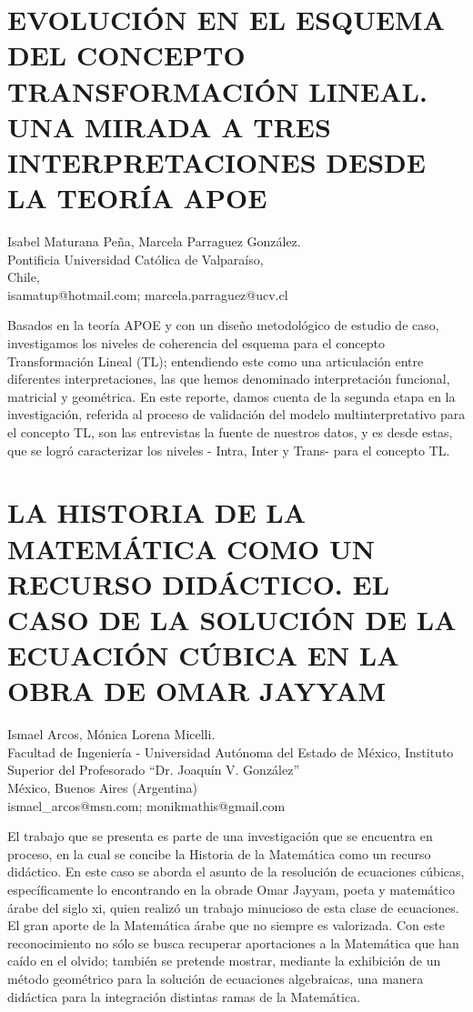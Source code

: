 \section{EVOLUCIÓN EN EL ESQUEMA DEL CONCEPTO TRANSFORMACIÓN LINEAL. UNA MIRADA
A TRES INTERPRETACIONES DESDE LA TEORÍA APOE}

\begin{datos}
Isabel Maturana Peña, Marcela Parraguez González. \\
 Pontificia Universidad Católica de Valparaíso, \\
\hfill Chile, \\
 \hfill  isamatup@hotmail.com; marcela.parraguez@ucv.cl
\end{datos}

Basados en la teoría APOE y con un diseño metodológico de estudio
de caso, investigamos los niveles de coherencia del esquema para el
concepto Transformación Lineal (TL); entendiendo este como una articulación
entre diferentes interpretaciones, las que hemos denominado interpretación
funcional, matricial y geométrica. En este reporte, damos cuenta de
la segunda etapa en la investigación, referida al proceso de validación
del modelo multinterpretativo para el concepto TL, son las entrevistas
la fuente de nuestros datos, y es desde estas, que se logró caracterizar
los niveles - Intra, Inter y Trans- para el concepto TL. 


\section{LA HISTORIA DE LA MATEMÁTICA COMO UN RECURSO DIDÁCTICO. EL CASO DE
LA SOLUCIÓN DE LA ECUACIÓN CÚBICA EN LA OBRA DE OMAR JAYYAM}

\begin{datos}
Ismael Arcos, Mónica Lorena Micelli. \\
Facultad de Ingeniería - Universidad Autónoma del Estado de México, Instituto Superior del Profesorado “Dr. Joaquín V. González”\\
\hfill México, Buenos Aires (Argentina) \\
 \hfill  ismael\_{}arcos@msn.com; monikmathis@gmail.com
\end{datos}

El trabajo que se presenta es parte de una investigación que se encuentra
en proceso, en la cual se concibe la Historia de la Matemática como
un recurso didáctico. En este caso se aborda el asunto de la resolución
de ecuaciones cúbicas, específicamente lo encontrando en la obrade
Omar Jayyam, poeta y matemático árabe del siglo xi, quien realizó
un trabajo minucioso de esta clase de ecuaciones. El gran aporte de
la Matemática árabe que no siempre es valorizada. Con este reconocimiento
no sólo se busca recuperar aportaciones a la Matemática que han caído
en el olvido; también se pretende mostrar, mediante la exhibición
de un método geométrico para la solución de ecuaciones algebraicas,
una manera didáctica para la integración distintas ramas de la Matemática. 


